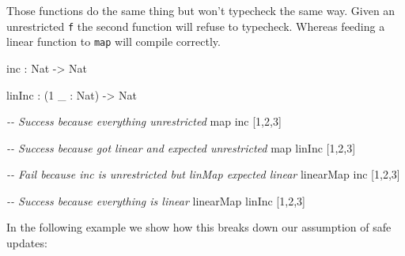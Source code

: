 \documentclass[
]{article}
\newenvironment{Shaded}{}{}
\newcommand{\CommentTok}[1]{\textcolor[rgb]{0.38,0.63,0.69}{\textit{#1}}}
\newcommand{\DataTypeTok}[1]{\textcolor[rgb]{0.56,0.13,0.00}{#1}}
\newcommand{\DecValTok}[1]{\textcolor[rgb]{0.25,0.63,0.44}{#1}}
\newcommand{\FunctionTok}[1]{\textcolor[rgb]{0.02,0.16,0.49}{#1}}
\newcommand{\KeywordTok}[1]{\textcolor[rgb]{0.00,0.44,0.13}{\textbf{#1}}}
\newcommand{\NormalTok}[1]{#1}
\newcommand{\OperatorTok}[1]{\textcolor[rgb]{0.40,0.40,0.40}{#1}}
\newcommand{\OtherTok}[1]{\textcolor[rgb]{0.00,0.44,0.13}{#1}}
\begin{document}
Those functions do the same thing but won't typecheck the same way.
Given an unrestricted \texttt{f} the second function will refuse to
typecheck. Whereas feeding a linear function to \texttt{map} will
compile correctly.

\begin{Shaded}
\begin{Highlighting}[]
\NormalTok{inc }\OperatorTok{:} \DataTypeTok{Nat} \OtherTok{{-}\textgreater{}} \DataTypeTok{Nat}

\NormalTok{linInc }\OperatorTok{:}\NormalTok{ (}\DecValTok{1}\NormalTok{ \_ }\OperatorTok{:} \DataTypeTok{Nat}\NormalTok{) }\OtherTok{{-}\textgreater{}} \DataTypeTok{Nat}

\CommentTok{{-}{-} Success because everything unrestricted}
\FunctionTok{map}\NormalTok{ inc [}\DecValTok{1}\NormalTok{,}\DecValTok{2}\NormalTok{,}\DecValTok{3}\NormalTok{] }

\CommentTok{{-}{-} Success because got linear and expected unrestricted}
\FunctionTok{map}\NormalTok{ linInc [}\DecValTok{1}\NormalTok{,}\DecValTok{2}\NormalTok{,}\DecValTok{3}\NormalTok{]}

\CommentTok{{-}{-} Fail because inc is unrestricted but linMap expected linear}
\NormalTok{linearMap inc [}\DecValTok{1}\NormalTok{,}\DecValTok{2}\NormalTok{,}\DecValTok{3}\NormalTok{]}

\CommentTok{{-}{-} Success because everything is linear}
\NormalTok{linearMap linInc [}\DecValTok{1}\NormalTok{,}\DecValTok{2}\NormalTok{,}\DecValTok{3}\NormalTok{]}
\end{Highlighting}
\end{Shaded}

In the following example we show how this breaks down our assumption of
safe updates:

\begin{Shaded}
\end{Shaded}
\end{document}
